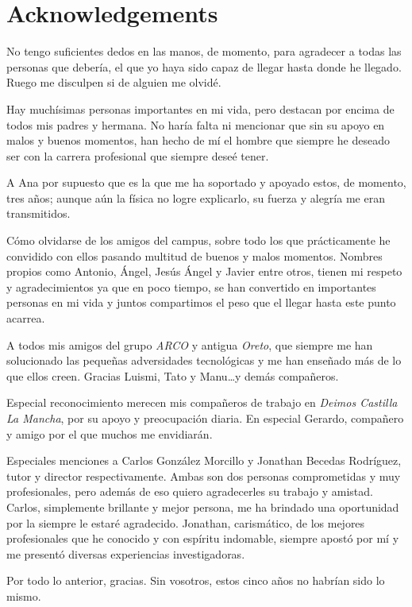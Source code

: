 \chapter{Acknowledgements}

No tengo suficientes dedos en las manos, de momento, para agradecer a todas las
personas que debería, el que yo
haya sido capaz de llegar hasta donde he llegado. Ruego me disculpen si de
alguien me olvidé.

Hay muchísimas personas importantes en mi vida, pero destacan por encima de
todos mis padres y hermana. No  haría falta ni mencionar que sin su apoyo en
malos y buenos momentos, han hecho de mí el hombre que siempre he deseado ser
con la carrera profesional que siempre deseé tener.

A Ana por supuesto que es la que me ha soportado y apoyado estos, de momento, tres
años; aunque aún la física no logre explicarlo, su fuerza y alegría me eran
transmitidos.

Cómo olvidarse de los amigos del campus, sobre todo los que prácticamente he
convidido con ellos pasando multitud de buenos y malos momentos. Nombres propios como Antonio, Ángel, Jesús Ángel y Javier entre
otros, tienen mi respeto y agradecimientos ya que en poco tiempo, se han
convertido en importantes personas en mi vida y juntos compartimos el peso que
el llegar hasta este punto acarrea. 

A todos mis amigos del grupo \emph{ARCO} y antigua \emph{Oreto}, que siempre me han solucionado las
pequeñas adversidades tecnológicas y me han enseñado más de lo que ellos
creen. Gracias Luismi, Tato y Manu\ldots y demás compañeros.

Especial reconocimiento merecen mis compañeros de trabajo en \emph{Deimos
  Castilla La Mancha}, por su apoyo y preocupación diaria. En especial Gerardo,
compañero y amigo  por el que muchos me envidiarán.

Especiales menciones a Carlos González Morcillo y Jonathan Becedas Rodríguez,
tutor y director respectivamente. Ambas son dos personas comprometidas y muy
profesionales, pero además de eso quiero agradecerles su trabajo y
amistad. Carlos, simplemente brillante y mejor persona, me ha brindado una
oportunidad por la siempre le estaré agradecido. Jonathan, carismático,
de los mejores profesionales que he conocido y con espíritu indomable, siempre
apostó por mí y me presentó diversas experiencias investigadoras. 

Por todo lo anterior, gracias. Sin vosotros, estos cinco años no habrían sido lo
mismo.\\


